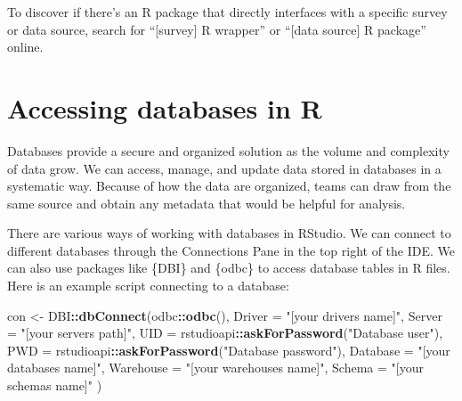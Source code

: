 \documentclass[
]{krantz}
\makeatletter
\newenvironment{Shaded}{\begin{snugshade}}{\end{snugshade}}
\newcommand{\AttributeTok}[1]{\textcolor[rgb]{0.27,0.27,0.27}{#1}}
\newcommand{\FunctionTok}[1]{\textcolor[rgb]{0.27,0.27,0.27}{\textbf{#1}}}
\newcommand{\NormalTok}[1]{#1}
\newcommand{\OtherTok}[1]{\textcolor[rgb]{0.37,0.37,0.37}{#1}}
\newcommand{\SpecialCharTok}[1]{\textcolor[rgb]{0.43,0.43,0.43}{\textbf{#1}}}
\newcommand{\StringTok}[1]{\textcolor[rgb]{0.5,0.5,0.5}{#1}}
\newenvironment{kframe}{%
\medskip{}
\setlength{\fboxsep}{.8em}
 \def\at@end@of@kframe{}%
 \ifinner\ifhmode%
  \def\at@end@of@kframe{\end{minipage}}%
  \begin{minipage}{\columnwidth}%
 \fi\fi%
 \def\FrameCommand##1{\hskip\@totalleftmargin \hskip-\fboxsep
 \colorbox{shadecolor}{##1}\hskip-\fboxsep
     \hskip-\linewidth \hskip-\@totalleftmargin \hskip\columnwidth}%
 \MakeFramed {\advance\hsize-\width
   \@totalleftmargin\z@ \linewidth\hsize
   \@setminipage}}%
 {\par\unskip\endMakeFramed%
 \at@end@of@kframe}
\renewenvironment{Shaded}{\begin{kframe}}{\end{kframe}}
\makeatother
\begin{document}
To discover if there's an R package that directly interfaces with a specific survey or data source, search for ``{[}survey{]} R wrapper'' or ``{[}data source{]} R package'' online.

\hypertarget{accessing-databases-in-r}{%
\section{Accessing databases in R}\label{accessing-databases-in-r}}

Databases provide a secure and organized solution as the volume and complexity of data grow. We can access, manage, and update data stored in databases in a systematic way. Because of how the data are organized, teams can draw from the same source and obtain any metadata that would be helpful for analysis.

There are various ways of working with databases in RStudio. We can connect to different databases through the Connections Pane in the top right of the IDE. We can also use packages like \{DBI\} and \{odbc\} to access database tables in R files. Here is an example script connecting to a database:

\begin{Shaded}
\begin{Highlighting}[]
\NormalTok{con }\OtherTok{\textless{}{-}}\NormalTok{ DBI}\SpecialCharTok{::}\FunctionTok{dbConnect}\NormalTok{(odbc}\SpecialCharTok{::}\FunctionTok{odbc}\NormalTok{(),}
                      \AttributeTok{Driver       =} \StringTok{"[your driver\textquotesingle{}s name]"}\NormalTok{,}
                      \AttributeTok{Server       =} \StringTok{"[your server\textquotesingle{}s path]"}\NormalTok{,}
                      \AttributeTok{UID          =}\NormalTok{ rstudioapi}\SpecialCharTok{::}\FunctionTok{askForPassword}\NormalTok{(}\StringTok{"Database user"}\NormalTok{),}
                      \AttributeTok{PWD          =}\NormalTok{ rstudioapi}\SpecialCharTok{::}\FunctionTok{askForPassword}\NormalTok{(}\StringTok{"Database password"}\NormalTok{),}
                      \AttributeTok{Database     =} \StringTok{"[your database\textquotesingle{}s name]"}\NormalTok{,}
                      \AttributeTok{Warehouse    =} \StringTok{"[your warehouse\textquotesingle{}s name]"}\NormalTok{,}
                      \AttributeTok{Schema       =} \StringTok{"[your schema\textquotesingle{}s name]"}
\NormalTok{                      )}
\end{Highlighting}
\end{Shaded}
\end{document}
